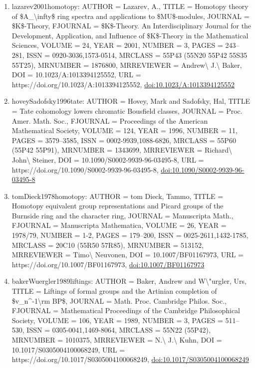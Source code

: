 \documentclass[11pt]{article}
\begin{document}
\begin{enumerate}[leftmargin=*]
  \item lazarev2001homotopy: AUTHOR = Lazarev, A., TITLE = Homotopy theory of \$A\_\textbackslash{}infty\$ ring spectra and applications to \$MU\$-modules, JOURNAL = \$K\$-Theory, FJOURNAL = \$K\$-Theory. An Interdisciplinary Journal for the Development, Application, and Influence of \$K\$-Theory in the Mathematical Sciences, VOLUME = 24, YEAR = 2001, NUMBER = 3, PAGES = 243--281, ISSN = 0920-3036,1573-0514, MRCLASS = 55P43 (55N20 55P42 55S35 55T25), MRNUMBER = 1876800, MRREVIEWER = Andrew\textbackslash{} J.\textbackslash{} Baker, DOI = 10.1023/A:1013394125552, URL = https://doi.org/10.1023/A:1013394125552, \href{https://doi.org/10.1023/A:1013394125552}{doi:10.1023/A:1013394125552}
  \item hoveySadofsky1996tate: AUTHOR = Hovey, Mark and Sadofsky, Hal, TITLE = Tate cohomology lowers chromatic Bousfield classes, JOURNAL = Proc. Amer. Math. Soc., FJOURNAL = Proceedings of the American Mathematical Society, VOLUME = 124, YEAR = 1996, NUMBER = 11, PAGES = 3579--3585, ISSN = 0002-9939,1088-6826, MRCLASS = 55P60 (55P42 55P91), MRNUMBER = 1343699, MRREVIEWER = Richard\textbackslash{} John\textbackslash{} Steiner, DOI = 10.1090/S0002-9939-96-03495-8, URL = https://doi.org/10.1090/S0002-9939-96-03495-8, \href{https://doi.org/10.1090/S0002-9939-96-03495-8}{doi:10.1090/S0002-9939-96-03495-8}
  \item tomDieck1978homotopy: AUTHOR = tom Dieck, Tammo, TITLE = Homotopy equivalent group representations and Picard groups of the Burnside ring and the character ring, JOURNAL = Manuscripta Math., FJOURNAL = Manuscripta Mathematica, VOLUME = 26, YEAR = 1978/79, NUMBER = 1-2, PAGES = 179--200, ISSN = 0025-2611,1432-1785, MRCLASS = 20C10 (55R50 57R85), MRNUMBER = 513152, MRREVIEWER = Timo\textbackslash{} Neuvonen, DOI = 10.1007/BF01167973, URL = https://doi.org/10.1007/BF01167973, \href{https://doi.org/10.1007/BF01167973}{doi:10.1007/BF01167973}
  \item bakerWuergler1989liftings: AUTHOR = Baker, Andrew and W\textbackslash{}"urgler, Urs, TITLE = Liftings of formal groups and the Artinian completion of \$v\_n\^{}-1\textbackslash{}rm BP\$, JOURNAL = Math. Proc. Cambridge Philos. Soc., FJOURNAL = Mathematical Proceedings of the Cambridge Philosophical Society, VOLUME = 106, YEAR = 1989, NUMBER = 3, PAGES = 511--530, ISSN = 0305-0041,1469-8064, MRCLASS = 55N22 (55P42), MRNUMBER = 1010375, MRREVIEWER = N.\textbackslash{} J.\textbackslash{} Kuhn, DOI = 10.1017/S0305004100068249, URL = https://doi.org/10.1017/S0305004100068249, \href{https://doi.org/10.1017/S0305004100068249}{doi:10.1017/S0305004100068249}

\end{enumerate}
\end{document}
